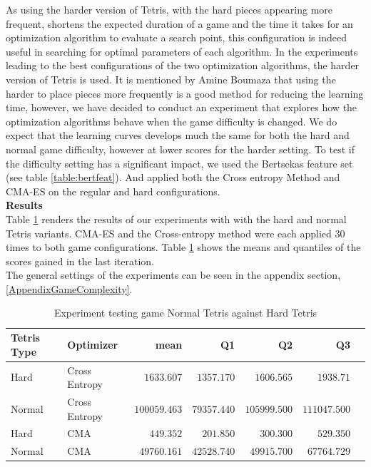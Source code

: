 As using the harder version of Tetris, with the hard pieces appearing more frequent, shortens
the expected duration of a game and  the time it takes for an optimization algorithm 
to evaluate a search point, this configuration is indeed useful in searching for optimal parameters
of each algorithm. In the experiments leading to the best configurations of the two 
optimization algorithms, the harder version of Tetris is used. It is mentioned
by Amine Boumaza that using the harder to place pieces more frequently is a good method
for reducing the learning time, however, we have decided to conduct an experiment that explores
how the optimization algorithms behave when the game difficulty is changed.
We do expect that the learning curves develops much the same 
for both the hard and normal game difficulty, however
at lower scores for the harder setting.
To test if the difficulty setting has a significant impact, we used the Bertsekas
feature set (see table \ref{table:bertfeat}). And applied both the Cross entropy 
Method and CMA-ES on the regular and hard configurations.\\

\textbf{Results}\\
Table \ref{table:difficultyRes} renders the results of our experiments 
with with the hard and normal Tetris variants. CMA-ES and the Cross-entropy method 
were each applied 30 times to both game configurations. Table \ref{table:difficultyRes}
shows the means and quantiles of the scores gained in the last iteration.\\
The general settings of the experiments can be seen in the appendix section, \ref{AppendixGameComplexity}.

\begin{table}[H]
\centering
\small
\begin{tabular}{l l r r r r r}
Tetris Type & Optimizer & mean & Q1 & Q2 & Q3\\
\hline
Hard & Cross Entropy & $1633.607$ & $1357.170$ & $1606.565$ & $1938.71$\\
Normal & Cross Entropy & $100059.463$ & $79357.440$ & $105999.500$ & $111047.500$\\
Hard & CMA & $449.352$ & $201.850$ & $300.300$ & $529.350$\\
Normal & CMA & $49760.161$ & $42528.740$ & $49915.700$ & $67764.729$\\
\end{tabular}
\caption{Experiment testing game Normal Tetris against Hard Tetris \label{table:difficultyRes}}
\end{table}

